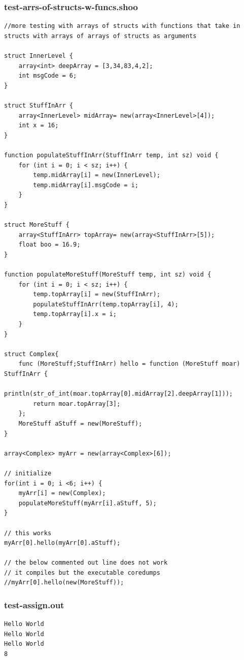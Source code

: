 \documentclass[12pt]{article}
\begin{document}
\subsubsection{test-arrs-of-structs-w-funcs.shoo}
\begin{mdframed}[hidealllines=true,backgroundcolor=blue!10]
\begin{lstlisting}
//more testing with arrays of structs with functions that take in structs with arrays of arrays of structs as arguments

struct InnerLevel {
	array<int> deepArray = [3,34,83,4,2];
	int msgCode = 6;
}

struct StuffInArr {
	array<InnerLevel> midArray= new(array<InnerLevel>[4]);
	int x = 16;
}

function populateStuffInArr(StuffInArr temp, int sz) void {
	for (int i = 0; i < sz; i++) {
		temp.midArray[i] = new(InnerLevel);
		temp.midArray[i].msgCode = i;
	}
}

struct MoreStuff {
	array<StuffInArr> topArray= new(array<StuffInArr>[5]);
	float boo = 16.9;
}

function populateMoreStuff(MoreStuff temp, int sz) void {
	for (int i = 0; i < sz; i++) {
		temp.topArray[i] = new(StuffInArr);
		populateStuffInArr(temp.topArray[i], 4);
		temp.topArray[i].x = i;
	}
}

struct Complex{
	func (MoreStuff;StuffInArr) hello = function (MoreStuff moar) StuffInArr {
		println(str_of_int(moar.topArray[0].midArray[2].deepArray[1]));
		return moar.topArray[3];
	};
	MoreStuff aStuff = new(MoreStuff);
}

array<Complex> myArr = new(array<Complex>[6]);

// initialize
for(int i = 0; i <6; i++) {
	myArr[i] = new(Complex);
	populateMoreStuff(myArr[i].aStuff, 5);
}

// this works
myArr[0].hello(myArr[0].aStuff);

// the below commented out line does not work
// it compiles but the executable coredumps
//myArr[0].hello(new(MoreStuff));\end{lstlisting}
\end{mdframed}
\subsubsection{test-assign.out}
\begin{mdframed}[hidealllines=true,backgroundcolor=green!10]
\begin{lstlisting}
Hello World
Hello World
Hello World
8
\end{lstlisting}
\end{mdframed}
\end{document}
